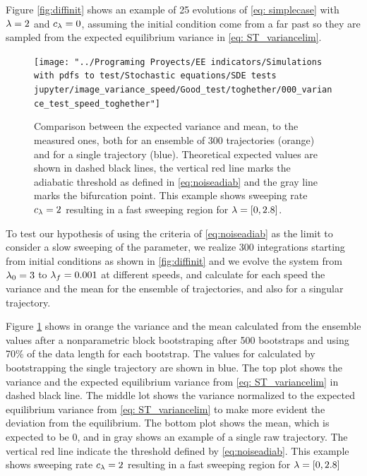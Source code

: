 Figure \ref{fig:diffinit} shows an example of 25 evolutions of \cref{eq: simplecase} with $\lambda=2$ and $c_\lambda=0$, assuming the initial condition come from  a far past so they are sampled from the expected equilibrium variance in \cref{eq: ST_variancelim}. 

\begin{figure}[tbp]
	\centering
	\texttt{[image: "../Programing Proyects/EE indicators/Simulations with pdfs to test/Stochastic equations/SDE tests jupyter/image\_variance\_speed/Good\_test/toghether/000\_variance\_test\_speed\_toghether"]}
	\caption{Comparison between the expected variance and mean, to the measured ones, both for an ensemble of 300 trajectories (orange) and for a single trajectory (blue). Theoretical expected values are shown in dashed black lines, the vertical red line marks the adiabatic threshold as defined in \cref{eq:noiseadiab} and the gray line marks the bifurcation point. This example shows sweeping rate $c_{\lambda}=2$ resulting in a fast sweeping region for $\lambda=[0,2.8]$.}
	\label{fig:000variancetestspeedtoghether}
\end{figure}


To test our hypothesis of using the criteria of \cref{eq:noiseadiab} as the limit to consider a slow sweeping of the parameter, we realize 300 integrations starting from initial conditions as shown in \cref{fig:diffinit} and we evolve the system from $\lambda_0=3$ to $\lambda_f=0.001$
 at different speeds, and calculate for each speed the variance and the mean for the ensemble of trajectories, and also for a  singular trajectory.
 
 Figure \ref{fig:000variancetestspeedtoghether} shows in orange the variance and the mean calculated from the ensemble values after a nonparametric block bootstraping after 500 bootstraps and using 70\% of the data length for each bootstrap. The values for calculated by bootstrapping the single trajectory are shown in blue.
 The top plot shows the variance and the expected equilibrium variance from  \cref{eq: ST_variancelim} in dashed black line.
 The middle lot shows the variance normalized to the expected  equilibrium variance from \cref{eq: ST_variancelim} to make more evident the deviation from the equilibrium.
 The bottom plot shows the mean, which is expected to be $0$, and in gray shows an example of a single raw trajectory.
 The vertical red line indicate the threshold defined by \cref{eq:noiseadiab}.
 This example shows sweeping rate $c_{\lambda}=2$ resulting in a fast sweeping region for $\lambda=[0,2.8]$
 
